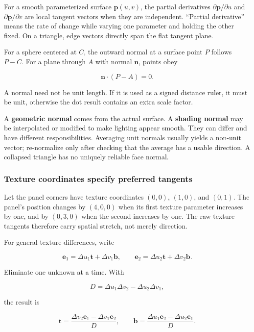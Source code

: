 For a smooth parameterized surface \(\mathbf p(u,v)\), the partial derivatives \(\partial\mathbf p/\partial u\) and \(\partial\mathbf p/\partial v\) are local tangent vectors when they are independent. ``Partial derivative'' means the rate of change while varying one parameter and holding the other fixed. On a triangle, edge vectors directly span the flat tangent plane.

For a sphere centered at \(C\), the outward normal at a surface point \(P\) follows \(P-C\). For a plane through \(A\) with normal \(\mathbf n\), points obey

\[
\mathbf n\cdot(P-A)=0.
\]

A normal need not be unit length. If it is used as a signed distance ruler, it must be unit, otherwise the dot result contains an extra scale factor.

A \textbf{geometric normal} comes from the actual surface. A \textbf{shading normal} may be interpolated or modified to make lighting appear smooth. They can differ and have different responsibilities. Averaging unit normals usually yields a non-unit vector; re-normalize only after checking that the average has a usable direction. A collapsed triangle has no uniquely reliable face normal.

\subsubsection{Texture coordinates specify preferred tangents}\label{texture-coordinates-specify-preferred-tangents}

Let the panel corners have texture coordinates \((0,0)\), \((1,0)\), and \((0,1)\). The panel's position changes by \((4,0,0)\) when its first texture parameter increases by one, and by \((0,3,0)\) when the second increases by one. The raw texture tangents therefore carry spatial stretch, not merely direction.

For general texture differences, write

\[
\mathbf e_1=\Delta u_1\mathbf t+\Delta v_1\mathbf b,
\qquad
\mathbf e_2=\Delta u_2\mathbf t+\Delta v_2\mathbf b.
\]

Eliminate one unknown at a time. With

\[
D=\Delta u_1\Delta v_2-\Delta u_2\Delta v_1,
\]

the result is

\[
\mathbf t=\frac{\Delta v_2\mathbf e_1-\Delta v_1\mathbf e_2}{D},
\qquad
\mathbf b=\frac{\Delta u_1\mathbf e_2-\Delta u_2\mathbf e_1}{D}.
\]

